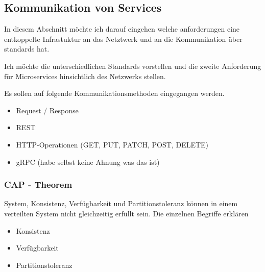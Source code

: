 \subsection{Kommunikation von Services}

In diesem Abschnitt möchte ich darauf eingehen welche anforderungen eine entkoppelte Infrastuktur an das Netztwerk und an die Kommunikation über standards hat.

Ich möchte die unterschiedlichen Standards vorstellen und die zweite Anforderung für Microservices hinsichtlich des Netzwerks stellen.

Es sollen auf folgende Kommunikationsmethoden eingegangen werden.
\begin{itemize}
	\item Request / Response
	\item REST
	\item HTTP-Operationen (GET, PUT, PATCH, POST, DELETE)
	\item gRPC (habe selbst keine Ahnung was das ist)
\end{itemize}

\subsubsection{CAP - Theorem}

System, Konsistenz, Verfügbarkeit und Partitionstoleranz können in einem verteilten System nicht gleichzeitig erfüllt sein.
Die einzelnen Begriffe erklären \begin{itemize}
	\item Konsistenz
	\item Verfügbarkeit
	\item Partitionstoleranz
\end{itemize}
